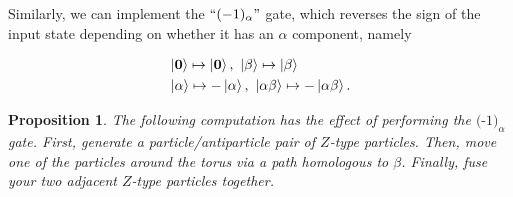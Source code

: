 \documentclass{article}
\newtheorem{proposition}{Proposition}[section]
\theoremstyle{definition}
\numberwithin{figure}{section}
\begin{document}
Similarly, we can implement the $``(-1)_{\alpha}"$ gate, which reverses the sign of the input state depending on whether it has an $\alpha$ component, namely

\begin{align*}
&\left|\bold{0}\right> \mapsto \left|\bold{0}\right>,\,\, \left|\beta\right> \mapsto \left|\beta\right> \\
&\left|\alpha\right> \mapsto -\left|\alpha\right>,\,\, \left|\alpha\beta\right> \mapsto -\left|\alpha\beta\right>.
\end{align*}

\begin{proposition}\label{Xparticle} The following computation has the effect of performing the $\text{(-1)}_{\alpha}$ gate. First, generate a particle/antiparticle pair of $Z$-type particles. Then, move one of the particles around the torus via a path homologous to $\beta$. Finally, fuse your two adjacent $Z$-type particles together.
\end{proposition}
\end{document}
